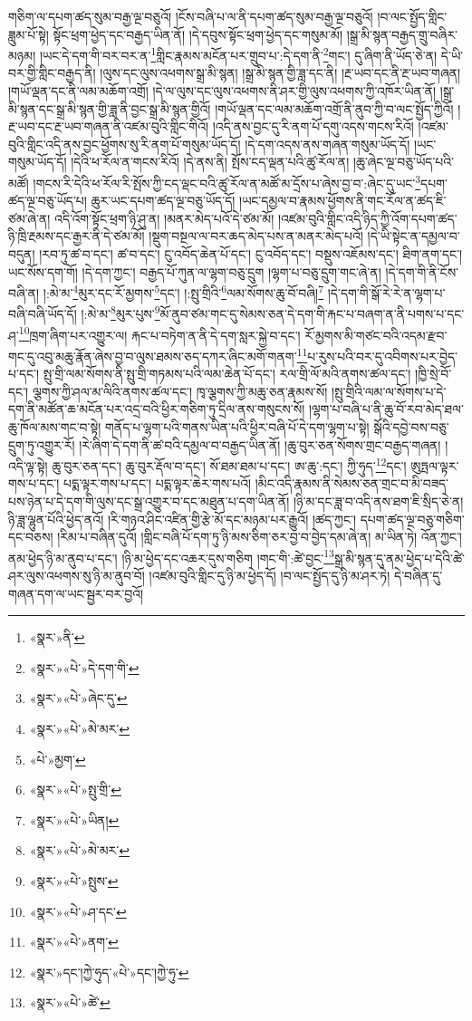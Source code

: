 གཅིག་ལ་དཔག་ཚད་སུམ་བརྒྱ་ལྔ་བཅུའོ། །ངོས་བཞི་པ་ལ་ནི་དཔག་ཚད་སུམ་བརྒྱ་ལྔ་བཅུའོ། །བ་ལང་སྤྱོད་གླིང་ཟླུམ་པོ་སྟེ། སྟོང་ཕྲག་ཕྱེད་དང་བརྒྱད་ཡིན་ནོ། །དེ་དབུས་སྟོང་ཕྲག་ཕྱེད་དང་གསུམ་མོ། །སྒྲ་མི་སྙན་བརྒྱད་གྲུ་བཞིར་མཉམ། །ཡང་དེ་དག་གི་བར་བར་ན་\footnote{«སྣར་»ནི་}གླིང་རྣམས་མངོན་པར་གྲུབ་པ་:དེ་དག་ནི་\footnote{«སྣར་»«པེ་»དེ་དག་གི་}གང་། དུ་ཞིག་ནི་ཡོད་ཅེ་ན། དེ་ཡི་བར་གྱི་གླིང་བརྒྱད་ནི། །ལུས་དང་ལུས་འཕགས་སྒྲ་མི་སྙན། །སྒྲ་མི་སྙན་གྱི་ཟླ་དང་ནི། །རྔ་ཡབ་དང་ནི་རྔ་ཡབ་གཞན། །གཡོ་ལྡན་དང་ནི་ལམ་མཆོག་འགྲོ། །དེ་ལ་ལུས་དང་ལུས་འཕགས་ནི་ཤར་གྱི་ལུས་འཕགས་ཀྱི་འཁོར་ཡིན་ནོ། །སྒྲ་མི་སྙན་དང་སྒྲ་མི་སྙན་གྱི་ཟླ་ནི་བྱང་སྒྲ་མི་སྙན་གྱིའོ། །གཡོ་ལྡན་དང་ལམ་མཆོག་འགྲོ་ནི་ནུབ་ཀྱི་བ་ལང་སྤྱོད་ཀྱིའོ། །རྔ་ཡབ་དང་རྔ་ཡབ་གཞན་ནི་འཛམ་བུའི་གླིང་གིའོ། །འདི་ནས་བྱང་དུ་རི་ནག་པོ་དགུ་འདས་གངས་རིའོ། །འཛམ་བུའི་གླིང་འདི་ནས་བྱང་ཕྱོགས་སུ་རི་ནག་པོ་གསུམ་ཡོད་དོ། །དེ་དག་འདས་ནས་གཞན་གསུམ་ཡོད་དོ། །ཡང་གསུམ་ཡོད་དོ། །དེའི་ཕ་རོལ་ན་གངས་རིའོ། །དེ་ནས་ནི། སྤོས་ངད་ལྡན་པའི་ཚུ་རོལ་ན། །ཆུ་ཞེང་ལྔ་བཅུ་ཡོད་པའི་མཚོ། །གངས་རི་དེའི་ཕ་རོལ་རི་སྤོས་ཀྱི་ངད་ལྡང་བའི་ཚུ་རོལ་ན་མཚོ་མ་དྲོས་པ་ཞེས་བྱ་བ་:ཞེང་དུ་ཡང་\footnote{«སྣར་»«པེ་»ཞེང་དུ་}དཔག་ཚད་ལྔ་བཅུ་ཡོད་པ། ཆུར་ཡང་དཔག་ཚད་ལྔ་བཅུ་ཡོད་དོ། །ཡང་དམྱལ་བ་རྣམས་ཕྱོགས་ནི་གང་རོལ་ན་ཚད་ཇི་ཙམ་ཞེ་ན། འདི་འོག་སྟོང་ཕྲག་ཉི་ཤུ་ན། །མནར་མེད་པའོ་དེ་ཙམ་མོ། །འཛམ་བུའི་གླིང་འདི་ཉིད་ཀྱི་འོག་དཔག་ཚད་ཉི་ཁྲི་རྔམས་དང་རྒྱར་ནི་དེ་ཙམ་མོ། །སྡུག་བསྔལ་ལ་བར་ཆད་མེད་པས་ན་མནར་མེད་པའོ། །དེ་ཡི་སྟེང་ན་དམྱལ་བ་བདུན། །རབ་ཏུ་ཚ་བ་དང་། ཚ་བ་དང་། ངུ་འབོད་ཆེན་པོ་དང་། ངུ་འབོད་དང་། བསྡུས་འཇོམས་དང་། ཐིག་ནག་དང་། ཡང་སོས་དག་གོ། །དེ་དག་ཀྱང་། བརྒྱད་པོ་ཀུན་ལ་ལྷག་བཅུ་དྲུག །ལྷག་པ་བཅུ་དྲུག་གང་ཞེ་ན། །དེ་དག་གི་ནི་ངོས་བཞི་ན། །:མེ་མ་\footnote{«སྣར་»«པེ་»མེ་མར་}མུར་དང་རོ་མྱགས་\footnote{«པེ་»མྱག་}དང་། །:སྤུ་གྲིའི་\footnote{«སྣར་»«པེ་»སྤུ་གྲི་}ལམ་སོགས་ཆུ་བོ་བཞི།\footnote{«སྣར་»«པེ་»ཡིན།} །དེ་དག་གི་སྒོ་རེ་རེ་ན་ལྷག་པ་བཞི་བཞི་ཡོད་དོ། །:མེ་མ་\footnote{«སྣར་»«པེ་»མེ་མར་}མུར་པུས་\footnote{«སྣར་»«པེ་»སྤུས་}མོ་ནུབ་ཙམ་གང་དུ་སེམས་ཅན་དེ་དག་གི་རྐང་པ་བཞག་ན་ནི་པགས་པ་དང་ཤ་\footnote{«སྣར་»«པེ་»ཤ་དང་}ཁྲག་ཞིག་པར་འགྱུར་ལ། རྐང་པ་བཏེག་ན་ནི་དེ་དག་སླར་སྐྱེ་བ་དང་། རོ་མྱགས་མི་གཙང་བའི་འདམ་རྫབ་གང་དུ་འབུ་མཆུ་རྣོན་ཞེས་བྱ་བ་ལུས་ཐམས་ཅད་དཀར་ཞིང་མགོ་གནག་\footnote{«སྣར་»«པེ་»ནག་}པ་རུས་པའི་བར་དུ་འབིགས་པར་བྱེད་པ་དང་། སྤུ་གྲི་ལམ་སོགས་ནི་སྤུ་གྲི་གཏམས་པའི་ལམ་ཆེན་པོ་དང་། རལ་གྲི་ལོ་མའི་ནགས་ཚལ་དང་། །ཁྱི་སྲེ་བོ་དང་། ལྕགས་ཀྱི་ཤལ་མ་ལིའི་ནགས་ཚལ་དང་། ཁྭ་ལྕགས་ཀྱི་མཆུ་ཅན་རྣམས་སོ། །སྤུ་གྲིའི་ལམ་ལ་སོགས་པ་དེ་དག་ནི་མཚོན་ཆ་མངོན་པར་འདྲ་བའི་ཕྱིར་གཅིག་ཏུ་དྲིལ་ནས་གསུངས་སོ། །ལྷག་པ་བཞི་པ་ནི་ཆུ་བོ་རབ་མེད་ཐལ་ཆུ་ཁོལ་མས་གང་བ་སྟེ། གནོད་པ་ལྷག་པའི་གནས་ཡིན་པའི་ཕྱིར་བཞི་པོ་དེ་དག་ལྷག་པ་སྟེ། སྒོའི་དབྱེ་བས་བཅུ་དྲུག་ཏུ་འགྱུར་རོ། །རེ་ཞིག་དེ་དག་ནི་ཚ་བའི་དམྱལ་བ་བརྒྱད་ཡིན་ནོ། །ཆུ་བུར་ཅན་སོགས་གྲང་བརྒྱད་གཞན། །འདི་ལྟ་སྟེ། ཆུ་བུར་ཅན་དང་། ཆུ་བུར་རྡོལ་བ་དང་། སོ་ཐམ་ཐམ་པ་དང་། ཨ་ཆུ་:དང་། ཀྱི་ཧུད་\footnote{«སྣར་»དང་།ཀྱེ་ཧུད་«པེ་»དང་།ཀྱེ་ཧུ་}དང་། ཨུཏྤལ་ལྟར་གས་པ་དང་། པདྨ་ལྟར་གས་པ་དང་། པདྨ་ལྟར་ཆེར་གས་པའོ། །མིང་འདི་རྣམས་ནི་སེམས་ཅན་གྲང་བ་མི་བཟད་པས་ཉེན་པ་དེ་དག་གི་ལུས་དང་སྒྲ་འགྱུར་བ་དང་མཐུན་པ་དག་ཡིན་ནོ། །ཉི་མ་དང་ཟླ་བ་འདི་ནས་ཐག་ཇི་སྲིད་ཅེ་ན། ཉི་ཟླ་ལྷུན་པོའི་ཕྱེད་ནའོ། །རི་གཉའ་ཤིང་འཛིན་གྱི་རྩེ་མོ་དང་མཉམ་པར་རྒྱུའོ། །ཚད་ཀྱང་། དཔག་ཚད་ལྔ་བཅུ་གཅིག་དང་བཅས། །རིམ་པ་བཞིན་དུའོ། །གླིང་བཞི་པོ་དག་ཏུ་ཉི་མས་ཅིག་ཅར་བྱ་བ་བྱེད་དམ་ཞེ་ན། མ་ཡིན་ཏེ། འོན་ཀྱང་། ནམ་ཕྱེད་ཉི་མ་ནུབ་པ་དང་། །ཉི་མ་ཕྱེད་དང་འཆར་དུས་གཅིག །གང་གི་:ཚེ་བྱང་\footnote{«སྣར་»«པེ་»ཚེ་}སྒྲ་མི་སྙན་དུ་ནམ་ཕྱེད་པ་དེའི་ཚེ་ཤར་ལུས་འཕགས་སུ་ཉི་མ་ནུབ་བོ། །འཛམ་བུའི་གླིང་དུ་ཉི་མ་ཕྱེད་དོ། །བ་ལང་སྤྱོད་དུ་ཉི་མ་ཤར་ཏེ། དེ་བཞིན་དུ་གཞན་དག་ལ་ཡང་སྦྱར་བར་བྱའོ། 